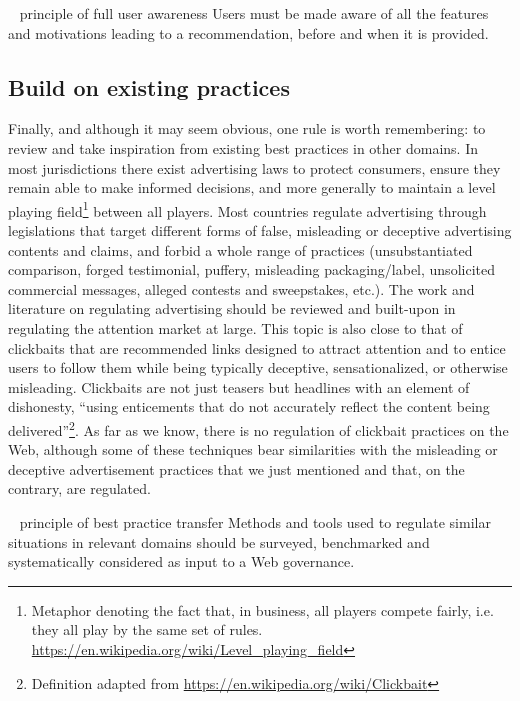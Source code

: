 \documentclass[10pt]{article}
\begin{document}
\begin{principle}{\faThumbTack ~ principle of full user awareness}
Users must be made aware of all the features and motivations leading to a recommendation, before and when it is provided.
\end{principle}



\subsection{Build on existing practices}
Finally, and although it may seem obvious, one rule is worth remembering: to review and take inspiration from existing best practices in other domains.
In most jurisdictions there exist advertising laws to protect consumers, ensure they remain able to make informed decisions, and more generally to maintain a level playing field\footnote{Metaphor denoting the fact that, in business, all players compete fairly, i.e. they all play by the same set of rules. \url{https://en.wikipedia.org/wiki/Level_playing_field}} between all players. 
Most countries regulate advertising through legislations that target different forms of false, misleading or deceptive advertising contents and claims, and forbid a whole range of practices (unsubstantiated comparison, forged testimonial, puffery, misleading packaging/label, unsolicited commercial messages, alleged contests and sweepstakes, etc.). The work and literature on regulating advertising should be reviewed and built-upon in regulating the attention market at large.
This topic is also close to that of clickbaits that are recommended links designed to attract attention and to entice users to follow them while being typically deceptive, sensationalized, or otherwise misleading. Clickbaits are not just teasers but headlines with an element of dishonesty, ``using enticements that do not accurately reflect the content being delivered''\footnote{Definition adapted from \url{https://en.wikipedia.org/wiki/Clickbait}}.
As far as we know, there is no regulation of clickbait practices on the Web, although some of these techniques bear similarities with the misleading or deceptive advertisement practices that we just mentioned and that, on the contrary, are regulated.

\begin{principle}{\faThumbTack ~ principle of best practice transfer}
Methods and tools used to regulate similar situations in relevant domains should be surveyed, benchmarked and systematically considered as input to a Web governance.
\end{principle}
\end{document}
